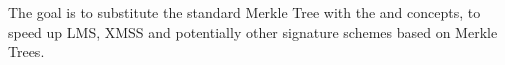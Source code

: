 



The goal is to substitute the standard Merkle Tree with the \tftree and \extree concepts, to speed up LMS, XMSS and potentially other signature schemes based on Merkle Trees.



